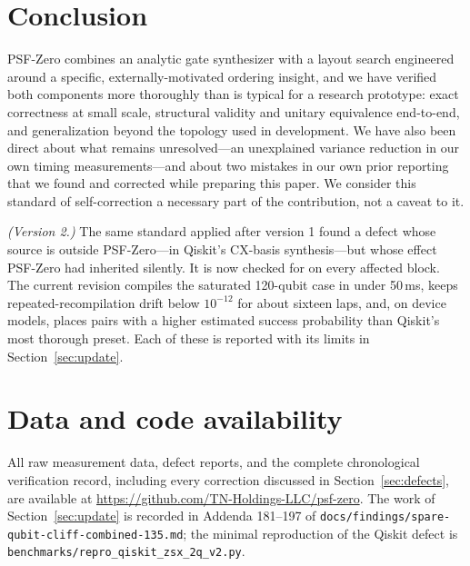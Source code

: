 \documentclass[11pt]{article}
\begin{document}
\section{Conclusion}

PSF-Zero combines an analytic gate synthesizer with a layout search
engineered around a specific, externally-motivated ordering insight,
and we have verified both components more thoroughly than is typical
for a research prototype: exact correctness at small scale, structural
validity and unitary equivalence end-to-end, and generalization beyond
the topology used in development. We have also been direct about what
remains unresolved---an unexplained variance reduction in our own
timing measurements---and about two mistakes in our own prior reporting
that we found and corrected while preparing this paper. We consider
this standard of self-correction a necessary part of the contribution,
not a caveat to it.

\emph{(Version 2.)} The same standard applied after version 1 found a
defect whose source is outside PSF-Zero---in Qiskit's CX-basis
synthesis---but whose effect PSF-Zero had inherited silently. It is now
checked for on every affected block. The current revision compiles the
saturated 120-qubit case in under 50\,ms, keeps repeated-recompilation
drift below $10^{-12}$ for about sixteen laps, and, on device models,
places pairs with a higher estimated success probability than Qiskit's
most thorough preset. Each of these is reported with its limits in
Section~\ref{sec:update}.

\section*{Data and code availability}

All raw measurement data, defect reports, and the complete
chronological verification record, including every correction
discussed in Section~\ref{sec:defects}, are available at
\url{https://github.com/TN-Holdings-LLC/psf-zero}. The work of
Section~\ref{sec:update} is recorded in Addenda 181--197 of
\texttt{docs/findings/spare-qubit-cliff-combined-135.md}; the minimal
reproduction of the Qiskit defect is
\texttt{benchmarks/repro\_qiskit\_zsx\_2q\_v2.py}.
\end{document}
